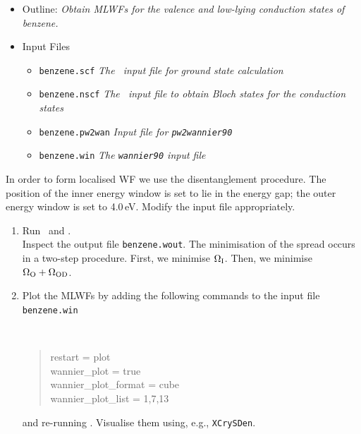 \documentclass[a4paper,11pt,twoside]{article}
\begin{document}
\begin{itemize}
\item{Outline: \it{Obtain MLWFs for the valence and low-lying
    conduction states of benzene.}} 
\item{Input Files}
\begin{itemize}
\item{ {\tt benzene.scf}  {\it The \pwscf\ input file for ground state
    calculation}} 
\item{ {\tt benzene.nscf}  {\it The \pwscf\ input file to obtain Bloch
    states for the conduction states}} 
\item{ {\tt benzene.pw2wan}  {\it Input file for {\tt pw2wannier90}}}
\item{ {\tt benzene.win}  {\it The {\tt wannier90} input file}}
\end{itemize}
\end{itemize}
In order to form localised WF we use the disentanglement
procedure. The position of the inner energy window is set to lie in
the energy gap; the outer energy window is set to 4.0\,eV. Modify the
input file appropriately. 
\begin{enumerate}
\item Run \pwscf\ and \wannier.\\
Inspect the output file {\tt benzene.wout}. The minimisation of the
spread occurs in a two-step procedure. First, we minimise $\Omega_{\rm
  I}$. Then, we minimise $\Omega_{\rm O}+\Omega_{{\rm OD}}$.

\item Plot the MLWFs by adding the following commands to the
 input file {\tt benzene.win}
{\tt
\begin{quote}
restart               = plot\\
wannier\_plot         = true\\
wannier\_plot\_format = cube\\
wannier\_plot\_list   = 1,7,13
\end{quote} }
and re-running \wannier. Visualise them using, e.g., {\tt XCrySDen}. 
\end{enumerate}


\end{document}
